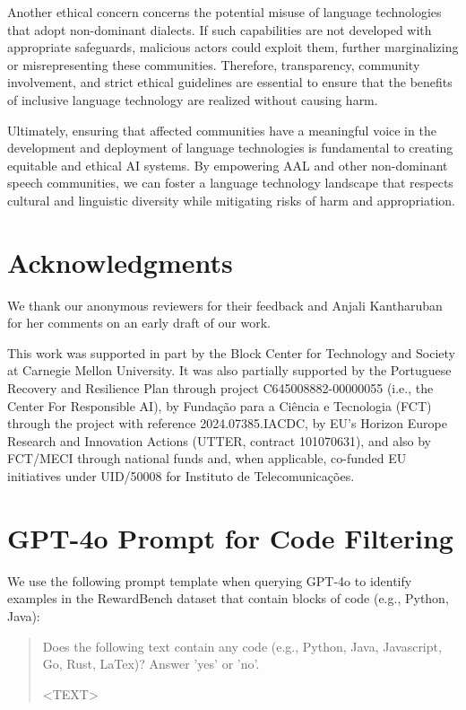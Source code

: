 Another ethical concern concerns the potential misuse of language technologies that adopt non-dominant dialects. If such capabilities are not developed with appropriate safeguards, malicious actors could exploit them, further marginalizing or misrepresenting these communities. Therefore, transparency, community involvement, and strict ethical guidelines are essential to ensure that the benefits of inclusive language technology are realized without causing harm.

Ultimately, ensuring that affected communities have a meaningful voice in the development and deployment of language technologies is fundamental to creating equitable and ethical AI systems. By empowering AAL and other non-dominant speech communities, we can foster a language technology landscape that respects cultural and linguistic diversity while mitigating risks of harm and appropriation.

\section*{Acknowledgments}
We thank our anonymous reviewers for their feedback and Anjali Kantharuban for her comments on an early draft of our work.

This work was supported in part by the Block Center for Technology and Society at Carnegie Mellon University. It was also partially supported by the Portuguese Recovery and Resilience Plan through project C645008882-00000055 (i.e., the Center For Responsible AI), by Funda\c{c}\~ao para a Ci\^encia e Tecnologia (FCT) through the project with reference 2024.07385.IACDC, by EU's Horizon Europe Research and Innovation Actions (UTTER, contract 101070631), and also by FCT/MECI through national funds and, when applicable, co-funded EU initiatives under UID/50008 for Instituto de Telecomunicações. 

\newpage
\newpage




\newpage
\appendix

\section{GPT-4o Prompt for Code Filtering}
\label{app:gpt4o-filter}
We use the following prompt template when querying GPT-4o to identify examples in the RewardBench dataset that contain blocks of code (e.g., Python, Java):
\begin{quote}
Does the following text contain any code (e.g., Python, Java, Javascript, Go, Rust, LaTex)? Answer 'yes' or 'no'.

<TEXT>
\end{quote}


